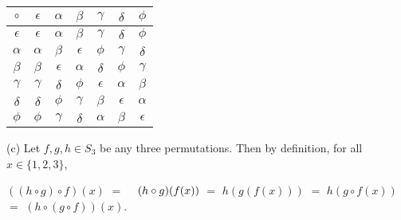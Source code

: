 \documentclass[12pt, a4paper]{article}
\begin{document}
\begin{flushleft}
\begin{table}[htb]
\centering
\begin{tabular}{c|cccccc}
\large$\circ$ & \large$\epsilon$ & \large$\alpha$ & \large$\beta$ & \large$\gamma$ & \large$\delta$ & \large$\phi$ \\
\hline
\large$\epsilon$ & \large$\epsilon$ & \large$\alpha$ & \large$\beta$ & \large$\gamma$ & \large$\delta$ & \large$\phi$ \\
$\alpha$ & $\alpha$ & $\beta$ & $\epsilon$ & $\phi$ & $\gamma$ & $\delta$ \\
\large$\beta$ & \large$\beta$ & \large$\epsilon$ & \large$\alpha$ & \large$\delta$ & \large$\phi$ & \large$\gamma$ \\
\large$\gamma$ & \large$\gamma$ & \large$\delta$ & \large$\phi$ & \large$\epsilon$ & \large$\alpha$ & \large$\beta$ \\
\large$\delta$ & \large$\delta$ & \large$\phi$ & \large$\gamma$ & \large$\beta$ & \large$\epsilon$ & \large$\alpha$ \\
\large$\phi$ & \large$\phi$ & \large$\gamma$ & \large$\delta$ & \large$\alpha$ & \large$\beta$ & \large$\epsilon$ \\
\end{tabular}
\end{table}



\begin{flushleft}

\vspace*{5mm}\hspace*{10mm}(c) Let $f,g,h\in S_3$ be any three permutations. Then by definition, for all 
\hspace*{16.7mm}$x\in \{1,2,3\}$,\vspace*{3mm}\linebreak


\hspace*{44.5mm}$((h\circ g)\circ f)(x)$\hspace*{3mm} $=$ $\hspace*{3mm} (h\circ g)(f(x))$\vspace*{5mm}\linebreak
\hspace*{76mm}$=$ \hspace*{3mm}$h(g(f(x)))$\vspace*{5mm}\linebreak
\hspace*{76mm}$=$ \hspace*{3mm}$h(g\circ f(x))$\vspace*{5mm}\linebreak
\hspace*{76mm}$=$ \hspace*{3mm}$(h\circ (g\circ f))(x).$\vspace*{3mm}\linebreak
 


\end{flushleft}
\end{flushleft}
\end{document}
